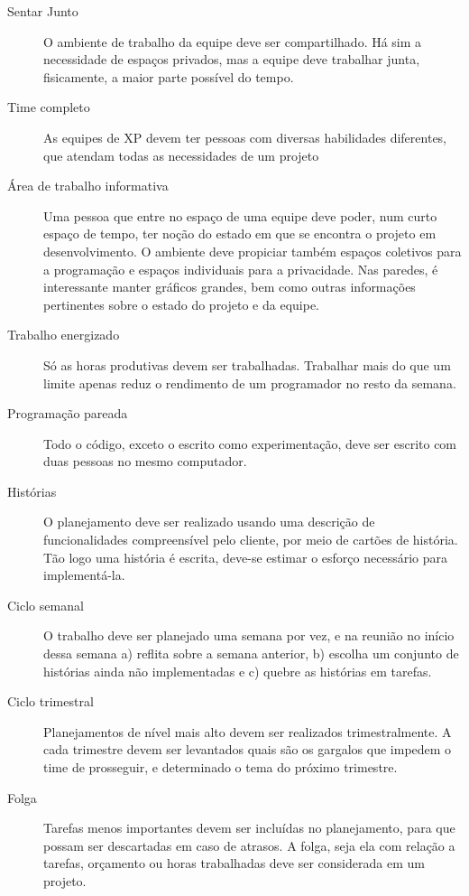 \documentclass[a4paper,12pt,font=plain,header=plain]{abnt}
\begin{document}
      \begin{description}
        \item[Sentar Junto]
          O ambiente de trabalho da equipe deve ser compartilhado. Há sim a necessidade de espaços privados, mas a equipe deve trabalhar junta, fisicamente, a maior parte possível do tempo.
        \item[Time completo]
          As equipes de XP devem ter pessoas com diversas habilidades diferentes, que atendam todas as necessidades de um projeto
        \item[Área de trabalho informativa]
          Uma pessoa que entre no espaço de uma equipe deve poder, num curto espaço de tempo, ter noção do estado em que se encontra o projeto em desenvolvimento. O ambiente deve propiciar também espaços coletivos para a programação e espaços individuais para a privacidade. Nas paredes, é interessante manter gráficos grandes, bem como outras informações pertinentes sobre o estado do projeto e da equipe.
        \item[Trabalho energizado]
          Só as horas produtivas devem ser trabalhadas. Trabalhar mais do que um limite apenas reduz o rendimento de um programador no resto da semana.
        \item[Programação pareada]
          Todo o código, exceto o escrito como experimentação, deve ser escrito com duas pessoas no mesmo computador.
        \item[Histórias]
          O planejamento deve ser realizado usando uma descrição de funcionalidades compreensível pelo cliente, por meio de cartões de história. Tão logo uma história é escrita, deve-se estimar o esforço necessário para implementá-la.
        \item[Ciclo semanal]
          O trabalho deve ser planejado uma semana por vez, e na reunião no início dessa semana a) reflita sobre a semana anterior, b) escolha um conjunto de histórias ainda não implementadas e c) quebre as histórias em tarefas.
        \item[Ciclo trimestral]
          Planejamentos de nível mais alto devem ser realizados trimestralmente. A cada trimestre devem ser levantados quais são os gargalos que impedem o time de prosseguir, e determinado o tema do próximo trimestre.
        \item[Folga]
          Tarefas menos importantes devem ser incluídas no planejamento, para que possam ser descartadas em caso de atrasos. A folga, seja ela com relação a tarefas, orçamento ou horas trabalhadas deve ser considerada em um projeto.

\end{description}
\end{document}
